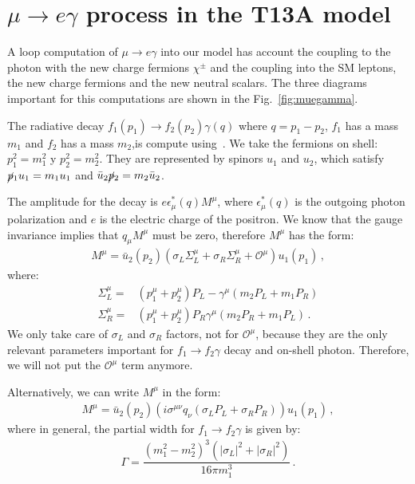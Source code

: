 \section{$\mu  \rightarrow e \gamma$ process in the T13A model}
\label{sec:Ap-muegamma}

A loop computation of $\mu  \rightarrow e \gamma$ into our model has account the coupling to the photon with the new charge fermions $\chi^{\pm}$ and the coupling into the SM leptons, the new charge fermions and the new  neutral scalars.
The three diagrams important for this computations are shown in the Fig.~\ref{fig:muegamma}.
 
The radiative decay $f_1(p_1)  \rightarrow f_2(p_2) \gamma (q)$ where $q=p_1-p_2$, $f_1$ has a mass $m_1$ and $f_2 $ has a mass $m_2$,is compute using~\cite{Lavoura:2003xp}.
We take the fermions on shell: $p_1^2=m_1^2$  y $p_2^2=m_2^2$. They are represented by spinors $u_1$ and $u_2$, which satisfy $\cancel{p}_1u_1=m_1u_1$ and $\bar{u}_2\cancel{p}_2=m_2\bar{u}_2$.

The amplitude for the decay is $e \epsilon^*_{\mu}(q)M^{\mu}$, where $\epsilon^*_{\mu}(q)$ is the outgoing photon polarization and $e$ is the electric charge of the positron. We know that the gauge invariance implies that $q_{\mu}M^{\mu}$ must be zero, therefore $M^{\mu}$ has the form:
\begin{align}
M^{\mu}=\bar{u}_2(p_2)( \sigma_L\Sigma_L^{\mu}+\sigma_R\Sigma_R^{\mu} +\mathcal{O}^{\mu} )u_1(p_1)\,,
\end{align}
where:
\begin{align}
\Sigma_L^{\mu}=&(p_1^{\mu}+p_2^{\mu})P_L-\gamma^{\mu}(m_2P_L+m_1P_R)\\	
\Sigma_R^{\mu}=&(p_1^{\mu}+p_2^{\mu})P_R\gamma^{\mu}(m_2P_R+m_1P_L)\,.
\end{align}
%
We only take care of $\sigma_{L}$ and $\sigma_{R}$ factors, not for $\mathcal{O}^{\mu}$, because they are the only relevant parameters important for $f_1 \rightarrow f_2 \gamma$ decay and on-shell photon. Therefore, we will not put the $\mathcal{O}^{\mu}$ term anymore.

Alternatively, we can write $M^{\mu}$ in the form:
\begin{align}
M^{\mu}=\bar{u}_2(p_2)( i\sigma^{\mu\nu}q_{\nu}(\sigma_LP_L+\sigma_RP_R))u_1(p_1)\,,
\end{align}
%
where in general, the partial width for $f_1\rightarrow f_2\gamma$ is given by:
%
\begin{align}
\Gamma = \dfrac{(m_1^2-m_2^2)^3(|\sigma_L|^2+|\sigma_R|^2)}{16\pi m_1^3}\,.
\label{partial_width_muegamma}
\end{align}

